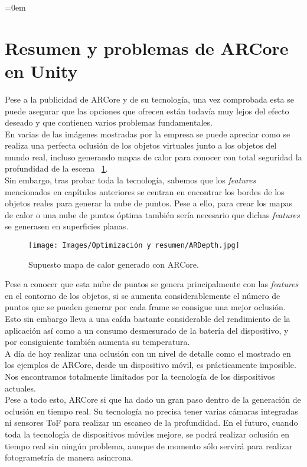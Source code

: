 \parindent=0em
\section{Resumen y problemas de ARCore en Unity}
\noindent

Pese a la publicidad de ARCore y de su tecnología, una vez comprobada esta se puede asegurar que las opciones que ofrecen están todavía muy lejos del efecto deseado y que contienen varios problemas fundamentales.\\

En varias de las imágenes mostradas por la empresa se puede apreciar como se realiza una perfecta oclusión de los objetos virtuales junto a los objetos del mundo real, incluso generando mapas de calor para conocer con total seguridad la profundidad de la escena ~\ref{fig:ARDepth}. \\

Sin embargo, tras probar toda la tecnología, sabemos que los \textit{features} mencionados en capítulos anteriores se centran en encontrar los bordes de los objetos reales para generar la nube de puntos. Pese a ello, para crear los mapas de calor o una nube de puntos óptima también sería necesario que dichas \textit{features} se generasen en superficies planas.\\

\begin{figure}[H]
    \centering
    \texttt{[image: Images/Optimización y resumen/ARDepth.jpg]}
    \caption[Supuesto mapa de calor generado con ARCore.]{Supuesto mapa de calor generado con ARCore.}
    \label{fig:ARDepth}
\end{figure}

Pese a conocer que esta nube de puntos se genera principalmente con las \textit{features} en el contorno de los objetos, si se aumenta considerablemente el número de puntos que se pueden generar por cada frame se consigue una mejor oclusión. Esto sin embargo lleva a una caída bastante considerable del rendimiento de la aplicación así como a un consumo desmesurado de la batería del dispositivo, y por consiguiente también aumenta su temperatura.\\

A día de hoy realizar una oclusión con un nivel de detalle como el mostrado en los ejemplos de ARCore, desde un dispositivo móvil, es prácticamente imposible. Nos encontramos totalmente limitados por la tecnología de los dispositivos actuales.\\

Pese a todo esto, ARCore si que ha dado un gran paso dentro de la generación de oclusión en tiempo real. Su tecnología no precisa tener varias cámaras integradas ni sensores ToF para realizar un escaneo de la profundidad. En el futuro, cuando toda la tecnología de dispositivos móviles mejore, se podrá realizar oclusión en tiempo real sin ningún problema, aunque de momento sólo servirá para realizar fotogrametría de manera asíncrona.\\